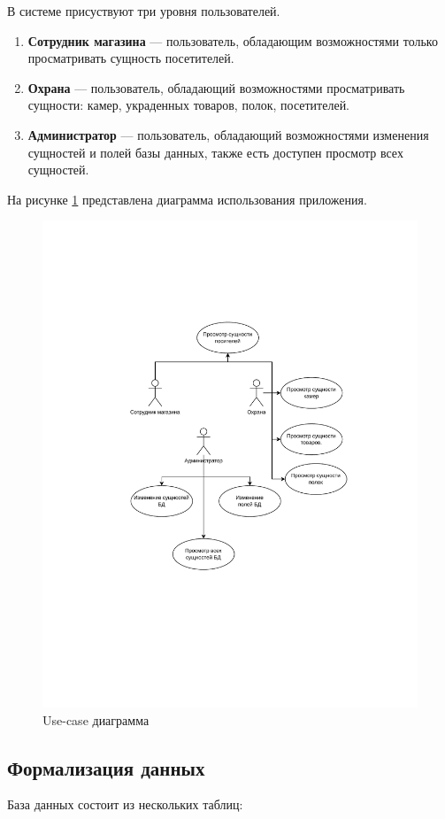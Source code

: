 В системе присуствуют три уровня пользователей.

\begin{enumerate}[label=\arabic*.]
    \item \textbf{Сотрудник магазина} --- пользователь, обладающим возможностями только просматривать
    сущность посетителей.
	\item \textbf{Охрана} --- пользователь, обладающий возможностями просматривать сущности: камер,
	украденных товаров, полок, посетителей.
	\item \textbf{Администратор} --- пользователь, обладающий возможностями изменения сущностей и полей
	базы данных, также есть доступен просмотр всех сущностей.
\end{enumerate}

На рисунке \ref{fig:anal:use-case} представлена диаграмма использования приложения.

\begin{figure}[ht!]
	\centering
	\includegraphics[width=0.7\linewidth]{assets/images/Use-case.drawio.pdf}
	\caption{Use-case диаграмма}
	\label{fig:anal:use-case}
\end{figure}
\FloatBarrier

\subsection{Формализация данных}

База данных состоит из нескольких таблиц:

